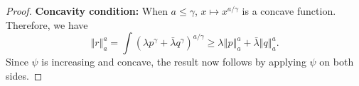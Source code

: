 \documentclass[11pt]{article}
\theoremstyle{plain}
\theoremstyle{remark}
\newcommand{\norm}[1]{\left\Vert #1 \right\Vert}
\begin{document}
\begin{proof}
    \noindent\textbf{Concavity condition:} When $a \leq \gamma$, $x \mapsto x^{a/\gamma}$ is a concave function. Therefore, we have
    \begin{equation*}
        \norm{r}_a^a = \int (\lambda p^\gamma + \bar{\lambda} q^\gamma)^{a/\gamma} \geq \lambda \norm{p}_a^a + \bar{\lambda} \norm{q}_a^a.
    \end{equation*}
    \noindent Since $\psi$ is increasing and concave, the result now follows by applying $\psi$ on both sides.
\end{proof}
\end{document}
